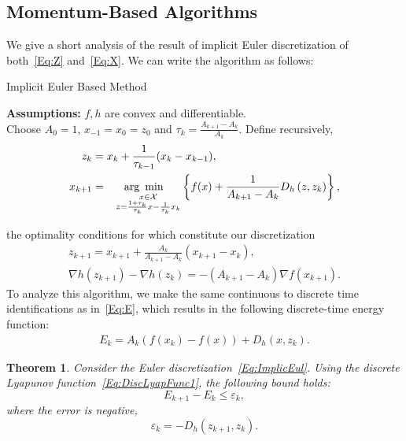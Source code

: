 \documentclass[11pt]{article}
\theoremstyle{plain}
\newtheorem{theorem}{Theorem}
\newcommand{\X}{{\mathcal X}}
\begin{document}
   \subsection{Momentum-Based Algorithms}
 We give a short analysis of the result of implicit Euler discretization of both~\eqref{Eq:Z} and~\eqref{Eq:X}. We can write the algorithm as follows:
\begin{algorithm}[H]
\caption{Implicit Euler Based Method}
{\bf Assumptions:} $f, h$ are convex and differentiable.\\
Choose $A_0 = 1$, $x_{-1}= x_0 = z_0$ and $\tau_{k} = \frac{A_{k+1} - A_k}{A_k}$. Define recursively,
\begin{subequations}\label{Eq:AlgoForward1}
\begin{align}
z_{k} &= x_{k} + \frac{1}{\tau_{k-1}} (x_{k} - x_{k-1}),\\%
x_{k+1} &= \underset{\substack{\,\,\,\,\,\,x\in\X\\ \,\,\,\,\,\,z =  \frac{1 + \tau_{k}}{\tau_{k}} x - \frac{1}{\tau_{k}} x_k}}{\text{arg\,\,\,min}} \left\{ f(x) + \frac{1}{A_{k+1} - A_k}D_h\left(z, z_k\right)\right\},
\end{align}
\end{subequations}
\end{algorithm}
\noindent the optimality conditions for which constitute our discretization
\begin{subequations}\label{Eq:ImplicEul}
\begin{align}
z_{k+1} = x_{k+1} + \frac{A_k}{A_{k+1} -A_{k}} (x_{k+1} - x_k),\label{Eq:ZSeq}\\
\nabla h(z_{k+1}) - \nabla h(z_k) = -(A_{k+1} - A_{k})\nabla f(x_{k+1})\label{Eq:XSeq}.
\end{align}
\end{subequations}
\noindent To analyze this algorithm, we make the same continuous to discrete time identifications as in~\eqref{Eq:E}, which results in the following discrete-time energy function:
\begin{align}\label{Eq:DiscLyapFunc1}
 E_k = A_k(f(x_k) - f(x)) + D_h(x, z_{k}). 
 \end{align}
\begin{theorem}
Consider the 
 Euler discretization~\eqref{Eq:ImplicEul}. Using the discrete Lyapunov function~\eqref{Eq:DiscLyapFunc1}, the following bound holds:
\begin{equation*}
E_{k+1} - E_k \leq \varepsilon_k,
\end{equation*}
where the error is negative,
\begin{equation*}
\varepsilon_k = -D_h(z_{k+1}, z_k).
\end{equation*}
\end{theorem}
\end{document}

